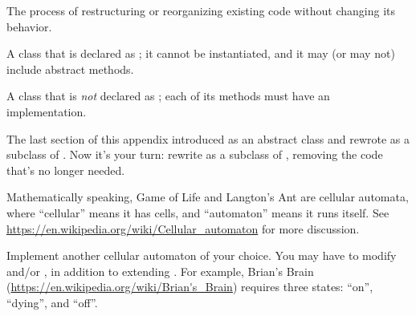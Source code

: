 \begin{description}

The process of restructuring or reorganizing existing code without changing its behavior.

A class that is declared as ; it cannot be instantiated, and it may (or may not) include abstract methods.

A class that is \emph{not} declared as ; each of its methods must have an implementation.

\end{description}



\begin{exercise}

The last section of this appendix introduced  as an abstract class and rewrote  as a subclass of .
Now it's your turn: rewrite  as a subclass of , removing the code that's no longer needed.

\end{exercise}


\begin{exercise}

Mathematically speaking, Game of Life and Langton's Ant are cellular automata, where ``cellular'' means it has cells, and ``automaton'' means it runs itself.
See \url{https://en.wikipedia.org/wiki/Cellular_automaton} for more discussion.

Implement another cellular automaton of your choice.
You may have to modify  and/or , in addition to extending .
For example, Brian's Brain (\url{https://en.wikipedia.org/wiki/Brian's_Brain}) requires three states: ``on'', ``dying'', and ``off''.

\end{exercise}
